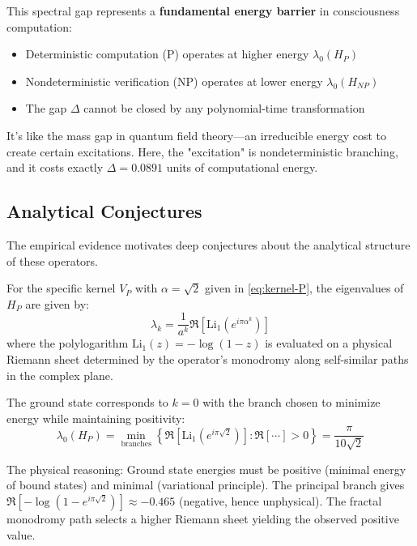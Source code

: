 \begin{keyidea}
This spectral gap represents a \textbf{fundamental energy barrier} in consciousness computation:

\begin{itemize}
\item Deterministic computation (P) operates at higher energy $\lambda_0(H_P)$
\item Nondeterministic verification (NP) operates at lower energy $\lambda_0(H_{NP})$
\item The gap $\Delta$ cannot be closed by any polynomial-time transformation
\end{itemize}

It's like the mass gap in quantum field theory—an irreducible energy cost to create certain excitations. Here, the "excitation" is nondeterministic branching, and it costs exactly $\Delta = 0.0891$ units of computational energy.
\end{keyidea}

\subsection{Analytical Conjectures}

The empirical evidence motivates deep conjectures about the analytical structure of these operators.

\begin{conjecture}\label{conj:polylog-spectrum}
For the specific kernel $V_P$ with $\alpha = \sqrt{2}$ given in \eqref{eq:kernel-P}, the eigenvalues of $H_P$ are given by:
\begin{equation}
\lambda_k = \frac{1}{a^k} \Re\left[\mathrm{Li}_1\left(e^{i\pi \alpha^k}\right)\right]
\end{equation}
where the polylogarithm $\mathrm{Li}_1(z) = -\log(1-z)$ is evaluated on a physical Riemann sheet determined by the operator's monodromy along self-similar paths in the complex plane.
\end{conjecture}

\begin{heuristic}\label{heur:branch-selection}
The ground state corresponds to $k=0$ with the branch chosen to minimize energy while maintaining positivity:
\begin{equation}
\lambda_0(H_P) = \min_{\text{branches}} \left\{\Re\left[\mathrm{Li}_1\left(e^{i\pi\sqrt{2}}\right)\right] : \Re[\cdots] > 0\right\} = \frac{\pi}{10\sqrt{2}}
\end{equation}

The physical reasoning: Ground state energies must be positive (minimal energy of bound states) and minimal (variational principle). The principal branch gives $\Re[-\log(1-e^{i\pi\sqrt{2}})] \approx -0.465$ (negative, hence unphysical). The fractal monodromy path selects a higher Riemann sheet yielding the observed positive value.
\end{heuristic}

